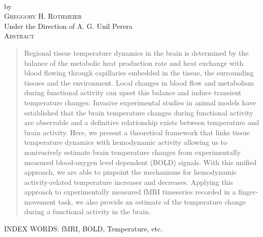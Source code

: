 \thispagestyle{empty}
\begin{center}
  { \huge \thesisTitle } \\
  \vspace{0.5in}
  by \\
  \vspace{0.5in}
  { \large \textsc{Greggory H. Rothmeier} } \\
  \vspace{0.5in}
  Under the Direction of A. G. Unil Perera\\
  \vspace{0.5in}
  \textsc{Abstract}
  \vspace{0.2in}
\end{center}
  \begin{quote}
    Regional tissue temperature dynamics in the brain is determined by the balance of the metabolic heat production rate 
    and heat exchange with blood flowing through capillaries embedded in the tissue, the surrounding tissues and the environment. Local 
    changes in blood flow and metabolism during functional activity can upset this balance and induce transient temperature changes. 
    Invasive experimental studies in animal models have established that the brain temperature changes during functional activity are observable 
    and a definitive relationship exists between temperature and brain activity. Here, we present a theoretical framework that links tissue 
    temperature dynamics with hemodynamic activity allowing us to nonivasively estimate brain temperature changes from experimentally 
    measured blood-oxygen level dependent (BOLD) signals. With this unified approach, we are able to pinpoint the mechanisms for 
    hemodynamic activity-related temperature increases and decreases. Applying this approach to experimentally measured fMRI timeseries 
    recorded in a finger-movement task, we also provide an estimate of the temperature change during a functional activity in the brain.
  \end{quote}
\vspace*{\fill}
INDEX WORDS: fMRI, BOLD, Temperature, etc.